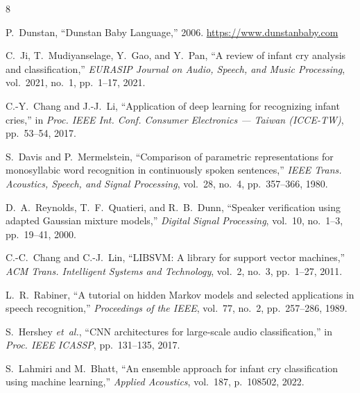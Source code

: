 \documentclass[conference]{IEEEtran}
\begin{document}
\begin{thebibliography}{8}

P.~Dunstan,
``Dunstan Baby Language,'' 2006.
\newblock \url{https://www.dunstanbaby.com}

C.~Ji, T.~Mudiyanselage, Y.~Gao, and Y.~Pan,
``A review of infant cry analysis and classification,''
\textit{EURASIP Journal on Audio, Speech, and Music Processing},
vol.~2021, no.~1, pp.~1--17, 2021.

C.-Y.~Chang and J.-J.~Li,
``Application of deep learning for recognizing infant cries,''
in \textit{Proc. IEEE Int. Conf. Consumer Electronics --- Taiwan
(ICCE-TW)}, pp.~53--54, 2017.

S.~Davis and P.~Mermelstein,
``Comparison of parametric representations for monosyllabic word
recognition in continuously spoken sentences,''
\textit{IEEE Trans. Acoustics, Speech, and Signal Processing},
vol.~28, no.~4, pp.~357--366, 1980.

D.~A.~Reynolds, T.~F.~Quatieri, and R.~B.~Dunn,
``Speaker verification using adapted Gaussian mixture models,''
\textit{Digital Signal Processing}, vol.~10, no.~1--3, pp.~19--41, 2000.

C.-C.~Chang and C.-J.~Lin,
``LIBSVM: A library for support vector machines,''
\textit{ACM Trans. Intelligent Systems and Technology},
vol.~2, no.~3, pp.~1--27, 2011.

L.~R.~Rabiner,
``A tutorial on hidden Markov models and selected applications in
speech recognition,''
\textit{Proceedings of the IEEE}, vol.~77, no.~2, pp.~257--286, 1989.

S.~Hershey \textit{et~al.},
``CNN architectures for large-scale audio classification,''
in \textit{Proc. IEEE ICASSP}, pp.~131--135, 2017.

S.~Lahmiri and M.~Bhatt,
``An ensemble approach for infant cry classification using machine
learning,''
\textit{Applied Acoustics}, vol.~187, p.~108502, 2022.

\end{thebibliography}
\end{document}
